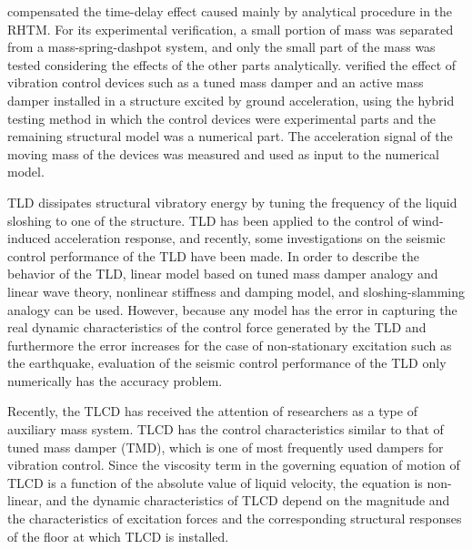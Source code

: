 \citet{horiuchi1999development} compensated the time-delay effect caused mainly by analytical procedure in the RHTM\citep{horiuchi1999development}. For its experimental verification, a small portion of mass was separated from a mass-spring-dashpot system, and only the small part of the mass was tested considering the effects of the other parts analytically. \citet{iemura1999substructured,igarashi2000development} verified the effect of vibration control devices such as a tuned mass damper and an active mass damper installed in a structure excited by ground acceleration, using the hybrid testing method in which the control devices were experimental parts and the remaining structural model was a numerical part. The acceleration signal of the moving mass of the devices was measured and used as input to the numerical model\cite{iemura1999substructured,igarashi2000development}.

TLD dissipates structural vibratory energy by tuning the frequency of the liquid sloshing to one of the structure\citep{soong1997passive}. TLD has been applied to the control of wind-induced acceleration response\citep{chang1998unified}, and recently, some investigations on the seismic control performance of the TLD have been made\citep{banerji2000tuned}. In order to describe the behavior of the TLD, linear model based on tuned mass damper analogy\citep{sun1995properties} and linear wave theory, nonlinear stiffness and damping model\citep{yu1999non}, and sloshing-slamming analogy\citep{yalla2001liquid} can be used. However, because any model has the error in capturing the real dynamic characteristics of the control force generated by the TLD and furthermore the error increases for the case of non-stationary excitation such as the earthquake, evaluation of the seismic control performance of the TLD only numerically has the accuracy problem.

Recently, the TLCD has received the attention of researchers as a type of auxiliary mass system\citep{samali1998wind}. TLCD has the control characteristics similar to that of tuned mass damper (TMD), which is one of most frequently used dampers for vibration control. Since the viscosity term in the governing equation of motion of TLCD is a function of the absolute value of liquid velocity, the equation is non-linear, and the dynamic characteristics of TLCD depend on the magnitude and the characteristics of excitation forces and the corresponding structural responses of the floor at which TLCD is installed\citep{yalla2001liquid}.

